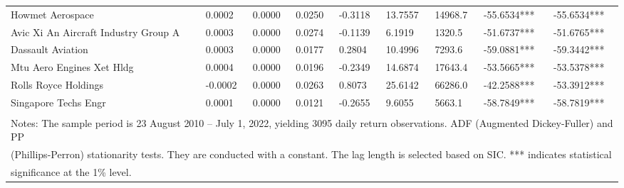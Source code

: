 \documentclass[
  letterpaper,
  DIV=11,
  numbers=noendperiod]{scrartcl}
\begin{document}
\begin{table}[H]
{\begin{tabular}[t]{lllllllll}
\addlinespace
Howmet Aerospace & 0.0002 & 0.0000 & 0.0250 & -0.3118 & 13.7557 & 14968.7 & -55.6534*** & -55.6534***\\
Avic Xi An Aircraft Industry Group  A & 0.0003 & 0.0000 & 0.0274 & -0.1139 & 6.1919 & 1320.5 & -51.6737*** & -51.6765***\\
Dassault Aviation & 0.0003 & 0.0000 & 0.0177 & 0.2804 & 10.4996 & 7293.6 & -59.0881*** & -59.3442***\\
Mtu Aero Engines  Xet  Hldg & 0.0004 & 0.0000 & 0.0196 & -0.2349 & 14.6874 & 17643.4 & -53.5665*** & -53.5378***\\
Rolls Royce Holdings & -0.0002 & 0.0000 & 0.0263 & 0.8073 & 25.6142 & 66286.0 & -42.2588*** & -53.3912***\\
\addlinespace
Singapore Techs Engr & 0.0001 & 0.0000 & 0.0121 & -0.2655 & 9.6055 & 5663.1 & -58.7849*** & -58.7819***\\
\bottomrule
\multicolumn{9}{l}{\textsuperscript{} Notes: The sample period is 23 August 2010 – July 1, 2022, yielding 3095 daily return observations. ADF (Augmented Dickey-Fuller) and PP}\\
\multicolumn{9}{l}{(Phillips-Perron) stationarity tests. They are conducted with a constant. The lag length is selected based on SIC. *** indicates statistical}\\
\multicolumn{9}{l}{significance at the 1\% level.}\\
\end{tabular}}
\end{table}
\end{document}
